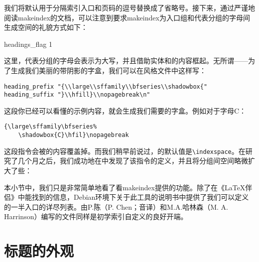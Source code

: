 我们将默认用于分隔索引入口和页码的逗号替换成了省略号。接下来，通过严谨地阅读\textsf{makeindex}的文档，可以注意到要求\textsf{makeindex}为入口组和代表分组的字母间生成空间的礼貌方式如下：

\begin{dmd}
headings\_flag 1
\end{dmd}

这里，代表分组的字母会表示为大写，并且借助实体和的内容框起。无所谓——为了生成我们美丽的带阴影的字盒，我们可以在风格文件中这样写：

\begin{dmd}
\begin{verbatim}
heading_prefix "{\\large\\sffamily\\bfseries\\shadowbox{"
heading_suffix "}\\hfill}\\nopagebreak\n"
\end{verbatim}
\end{dmd}

这段你已经可以看懂的示例内容，就会生成我们需要的字盒。例如对于字母C：

\begin{codelist}[10.1]{
    {\large\sffamily\bfseries%
    \hfil}\nopagebreak
}\begin{verbatim}
{\large\sffamily\bfseries%
    \shadowbox{C}\hfil}\nopagebreak
\end{verbatim}
\end{codelist}

这段指令会被的内容覆盖掉。而我们稍早前说过，的默认值是\verb|\indexspace|。在研究了几个月之后，我们成功地在中发现了该指令的定义，并且将分组间空间略微扩大了些：

\begin{dmd}
\renewcommand\indexspace{%
    \par \vskip 20pt plus5pt minus3pt\relax}
\end{dmd}

\begin{ii}
本小节中，我们只是非常简单地看了看makeindex提供的功能。除了在《\LaTeX 伴侣》中能找到的信息，Debian环境下关于此工具的说明书中提供了我们可以定义的一半入口的详尽列表。由P.陈（P. Chen；音译）和M.A.哈林森（M. A. Harrinson）编写的文件同样是初学索引自定义的良好开端。
\end{ii}

\section{标题的外观}